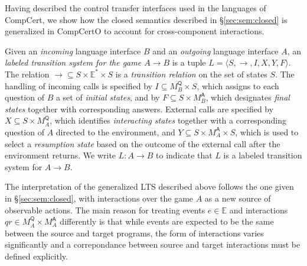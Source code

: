 \documentclass[sigplan,10pt,review,anonymous]{acmart}
\newcommand{\kw}[1]{\ensuremath{ \mathsf{#1} }}
\begin{document}
Having described the control transfer interfaces
used in the languages of CompCert,
we show how the closed semantics
described in \S\ref{sec:sem:closed}
is generalized in CompCertO
to account for cross-component interactions.
\cbend

\cbdelete

\begin{definition}
Given an \emph{incoming} language interface $B$
and an \emph{outgoing} language interface $A$,
an \emph{labeled transition system for the game $A \rightarrow B$}
is a tuple $L = \langle S, \rightarrow, I, X, Y, F \rangle$.
The relation
${\rightarrow} \subseteq S \times \mathbb{E}^* \times S$ is
a \emph{transition relation} on the set of states $S$.
The handling of incoming calls is specified by
$I \subseteq M_B^\kw{Q} \times S$, which
assigns to each question of $B$ a set of \emph{initial states}, and by
$F \subseteq S \times M_B^\kw{A}$,
which designates \emph{final states} together with corresponding answers.
External calls are specified by
$X \subseteq S \times M_A^\kw{Q}$,
which identifies \emph{interacting states} together with
a corresponding question of $A$ directed to the environment, and
$Y \subseteq S \times M_A^\kw{A} \times S$,
which is used to select a \emph{resumption state}
based on the outcome of the external call
after the environment returns.
We write $L : A \rightarrow B$ to indicate that
$L$ is a labeled transition system for $A \rightarrow B$.
\end{definition}

The interpretation of the generalized LTS described above
follows the one given in \S\ref{sec:sem:closed},
with interactions over the game $A$
as a new source of observable actions.
The main reason for treating
events $e \in \mathbb{E}$ and
interactions $qr \in M_A^\kw{Q} \times M_A^\kw{A}$
differently is that
while events are expected to be the same
between the source and target programs,
the form of interactions varies significantly
and a correpondance between source and target interactions
must be defined explicitly.
\end{document}
